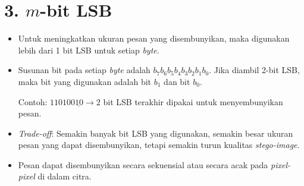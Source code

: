 \documentclass{article}
\begin{document}

\section*{3. $m$-bit LSB}

\begin{itemize}
    \item Untuk meningkatkan ukuran pesan yang disembunyikan, maka digunakan lebih dari 1 bit LSB untuk setiap \textit{byte}.
    \item Susunan bit pada setiap \textit{byte} adalah $b_7b_6b_5b_4b_3b_2b_1b_0$. Jika diambil 2-bit LSB, maka bit yang digunakan adalah bit $b_1$ dan bit $b_0$.
    
    Contoh: $110100\underline{10} \rightarrow 2$ bit LSB terakhir dipakai untuk menyembunyikan pesan.
    
    \item \textit{Trade-off}: Semakin banyak bit LSB yang digunakan, semakin besar ukuran pesan yang dapat disembunyikan, tetapi semakin turun kualitas \textit{stego-image}.
    \item Pesan dapat disembunyikan secara sekuensial atau secara acak pada \textit{pixel-pixel} di dalam citra.
\end{itemize}
\end{document}
